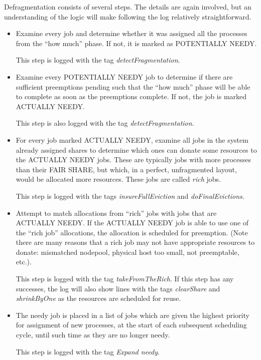     Defragmentation consists of several steps.  The details are again involved,
    but an understanding of the logic will make following the log relatively
    straightforward.
    \begin{itemize}
      \item Examine every job and determine whether it was assigned
        all the processes from the ``how much'' phase.  If not, it is marked
        as POTENTIALLY NEEDY.
        
        This step is logged with the tag {\em detectFragmentation}.

      \item Examine every POTENTIALLY NEEDY job to determine if there are
        sufficient preemptions pending such that the ``how much'' phase will be able
        to complete as soon as the preemptions complete.  If not, the
        job is marked ACTUALLY NEEDY.

        This step is also logged with the tag {\em detectFragmentation}.

      \item For every job marked ACTUALLY NEEDY, examine all jobs in the
        system already assigned shares to determine which ones can
        donate some resources to the ACTUALLY NEEDY jobs.  These are typically
        jobs with more processes than their FAIR SHARE, but which, in a
        perfect, unfragmented layout, would be allocated more resources.  These
        jobs are called {\em rich} jobs.
        
        This step is logged with the tags {\em insureFullEviction} and
        {\em doFinalEvictions}.

      \item Attempt to match allocations from ``rich'' jobs with jobs that
        are ACTUALLY NEEDY.  If the ACTUALLY NEEDY job is able to use
        one of the ``rich job'' allocations, the allocation is scheduled for
        preemption.  (Note there are many reasons that a rich job may not
        have appropriate resources to donate: mismatched nodepool, physical
        host too small, not preemptable, etc.).
        
        This step is logged with the tag {\em takeFromTheRich}. If this
        step has any successes, the log will also show lines with the
        tags {\em clearShare} and {\em shrinkByOne} as the resources
        are scheduled for reuse.

        \item The needy job is placed in a list of jobs which are given the
          highest priority for assignment of new processes, at the start of each
          subsequent scheduling cycle, until such time
          as they are no longer needy.

          This step is logged with the tag {\em Expand needy}.
    \end{itemize}

